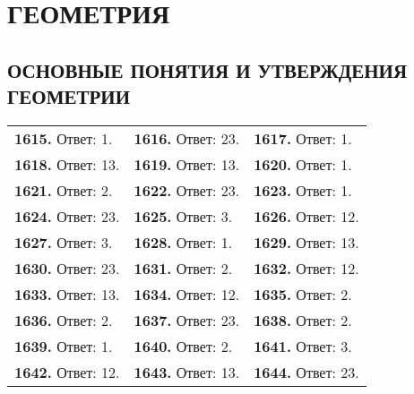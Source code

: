 \chapter{ГЕОМЕТРИЯ}
\section{ОСНОВНЫЕ ПОНЯТИЯ И УТВЕРЖДЕНИЯ ГЕОМЕТРИИ}

\begin{tabular}{ l l l } 
	\textbf{1615.} Ответ: 1. & \textbf{1616.} Ответ: 23. & \textbf{1617.} Ответ: 1.  \\
	\textbf{1618.} Ответ: 13. & \textbf{1619.} Ответ: 13. & \textbf{1620.} Ответ: 1. \\
	\textbf{1621.} Ответ: 2. & \textbf{1622.} Ответ: 23. & \textbf{1623.} Ответ: 1.  \\
	\textbf{1624.} Ответ: 23. & \textbf{1625.} Ответ: 3. & \textbf{1626.} Ответ: 12. \\
	\textbf{1627.} Ответ: 3. & \textbf{1628.} Ответ: 1. & \textbf{1629.} Ответ: 13. \\
	\textbf{1630.} Ответ: 23. & \textbf{1631.} Ответ: 2. & \textbf{1632.} Ответ: 12. \\
	\textbf{1633.} Ответ: 13. & \textbf{1634.} Ответ: 12. & \textbf{1635.} Ответ: 2. \\
	\textbf{1636.} Ответ: 2. & \textbf{1637.} Ответ: 23. & \textbf{1638.} Ответ: 2. \\
	\textbf{1639.} Ответ: 1. & \textbf{1640.} Ответ: 2. & \textbf{1641.} Ответ: 3. \\
	\textbf{1642.} Ответ: 12. & \textbf{1643.} Ответ: 13. & \textbf{1644.} Ответ: 23. \\
	
\end{tabular}
